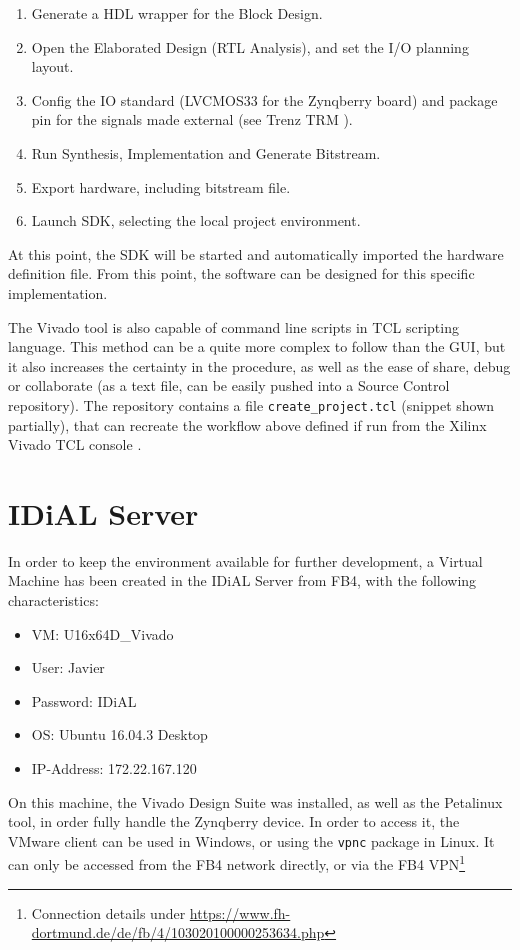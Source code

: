 \begin{enumerate}
	\item Generate a HDL wrapper for the Block Design.
	\item Open the Elaborated Design (RTL Analysis), and set the I/O planning layout.
	\item Config the IO standard (LVCMOS33 for the Zynqberry board) and package pin for the signals made external (see Trenz TRM \cite{zynq-trm}).
	\item Run Synthesis, Implementation and Generate Bitstream.
	\item Export hardware, including bitstream file.
	\item Launch SDK, selecting the local project environment.
\end{enumerate}

At this point, the SDK will be started and automatically imported the hardware definition file. From this point, the software can be designed for this specific implementation.

The Vivado tool is also capable of command line scripts in TCL scripting language. This method can be a quite more complex to follow than the GUI, but it also increases the certainty in the procedure, as well as the ease of share, debug or collaborate (as a text file, can be easily pushed into a Source Control repository). The repository contains a file \texttt{create\_project.tcl} (snippet shown partially), that can recreate the workflow above defined if run from the Xilinx Vivado TCL console \cite{UG835}.



\section{IDiAL Server}

In order to keep the environment available for further development, a Virtual Machine has been created in the IDiAL Server from FB4, with the following characteristics:

\begin{itemize}
	\item VM: U16x64D\_Vivado
	\item User: Javier
	\item Password: IDiAL
	\item OS: Ubuntu 16.04.3 Desktop
	\item IP-Address: 172.22.167.120
\end{itemize}

On this machine, the Vivado Design Suite was installed, as well as the Petalinux tool, in order fully handle the Zynqberry device. In order to access it, the VMware client can be used in Windows, or using the \texttt{vpnc} package in Linux. It can only be accessed from the FB4 network directly, or via the FB4 VPN\footnote{Connection details under \underline{https://www.fh-dortmund.de/de/fb/4/103020100000253634.php}}
